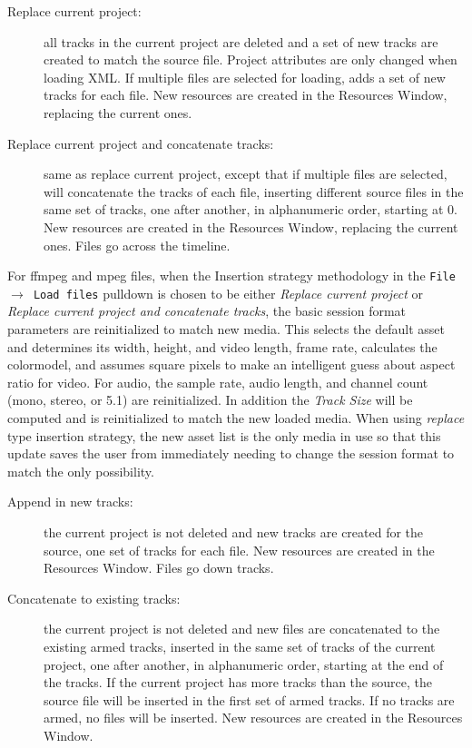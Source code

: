 \begin{description}
    \begin{description}
       \item [Replace current project:] all tracks in the current project are deleted and a set of new tracks are created to match the source file.  Project attributes are only changed when loading XML. If multiple files are selected for loading, \CGG{} adds a set of new tracks for each file. New resources are created in the Resources Window, replacing the current ones.
       \item [Replace current project and concatenate tracks: ] same as replace current project, except that if multiple files are selected, \CGG{} will concatenate the tracks of each file, inserting different source files in the same set of tracks, one after another, in alphanumeric order, starting at 0. New resources are created in the Resources Window, replacing the current ones.  Files go across the timeline.
    \end{description}
    For ffmpeg and mpeg files, when the Insertion strategy methodology in the \texttt{File $\rightarrow$ Load files} pulldown is chosen to be either \textit{Replace current project} or \textit{Replace current project and concatenate tracks}, the basic session format parameters are reinitialized to match new media.  This selects the default asset and determines its width, height, and video length, frame rate, calculates the colormodel, and assumes square pixels to make an intelligent guess about aspect ratio for video.  For audio, the sample rate, audio length, and channel count (mono, stereo, or 5.1) are reinitialized.  In addition the \textit{Track Size} will be computed and is reinitialized to match the new loaded media.  When using \textit{replace} type insertion strategy, the new asset list is the only media in use so that this update saves the user from immediately needing to change the session format to match the only possibility.
    \begin{description}
        \item[Append in new tracks:] the current project is not deleted and new tracks are created for the source, one set of tracks for each file. New resources are created in the Resources Window.  Files go down tracks.
        \item[Concatenate to existing tracks:]  the current project is not deleted and new files are concatenated to the existing armed tracks, inserted in the same set of tracks of the current project, one after another, in     alphanumeric order, starting at the end of the tracks. If the current project has more tracks than the source, the source file will be inserted in the first set of armed tracks. If no tracks are armed, no files will be inserted. New resources are created in the Resources Window.

\end{description}
\end{description}

